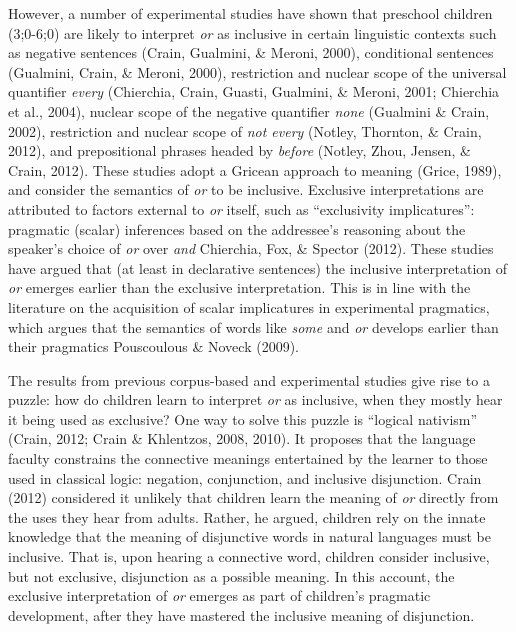 \documentclass[
  english,
  ,man,floatsintext]{apa6}
\begin{document}
However, a number of experimental studies have shown that preschool children (3;0-6;0) are likely to interpret \emph{or} as inclusive in certain linguistic contexts such as negative sentences (Crain, Gualmini, \& Meroni, 2000), conditional sentences (Gualmini, Crain, \& Meroni, 2000), restriction and nuclear scope of the universal quantifier \emph{every} (Chierchia, Crain, Guasti, Gualmini, \& Meroni, 2001; Chierchia et al., 2004), nuclear scope of the negative quantifier \emph{none} (Gualmini \& Crain, 2002), restriction and nuclear scope of \emph{not every} (Notley, Thornton, \& Crain, 2012), and prepositional phrases headed by \emph{before} (Notley, Zhou, Jensen, \& Crain, 2012). These studies adopt a Gricean approach to meaning (Grice, 1989), and consider the semantics of \emph{or} to be inclusive. Exclusive interpretations are attributed to factors external to \emph{or} itself, such as ``exclusivity implicatures'': pragmatic (scalar) inferences based on the addressee's reasoning about the speaker's choice of \emph{or} over \emph{and} Chierchia, Fox, \& Spector (2012). These studies have argued that (at least in declarative sentences) the inclusive interpretation of \emph{or} emerges earlier than the exclusive interpretation. This is in line with the literature on the acquisition of scalar implicatures in experimental pragmatics, which argues that the semantics of words like \emph{some} and \emph{or} develops earlier than their pragmatics Pouscoulous \& Noveck (2009).

The results from previous corpus-based and experimental studies give rise to a puzzle: how do children learn to interpret \emph{or} as inclusive, when they mostly hear it being used as exclusive? One way to solve this puzzle is ``logical nativism'' (Crain, 2012; Crain \& Khlentzos, 2008, 2010). It proposes that the language faculty constrains the connective meanings entertained by the learner to those used in classical logic: negation, conjunction, and inclusive disjunction. Crain (2012) considered it unlikely that children learn the meaning of \emph{or} directly from the uses they hear from adults. Rather, he argued, children rely on the innate knowledge that the meaning of disjunctive words in natural languages must be inclusive. That is, upon hearing a connective word, children consider inclusive, but not exclusive, disjunction as a possible meaning. In this account, the exclusive interpretation of \emph{or} emerges as part of children's pragmatic development, after they have mastered the inclusive meaning of disjunction.
\end{document}
